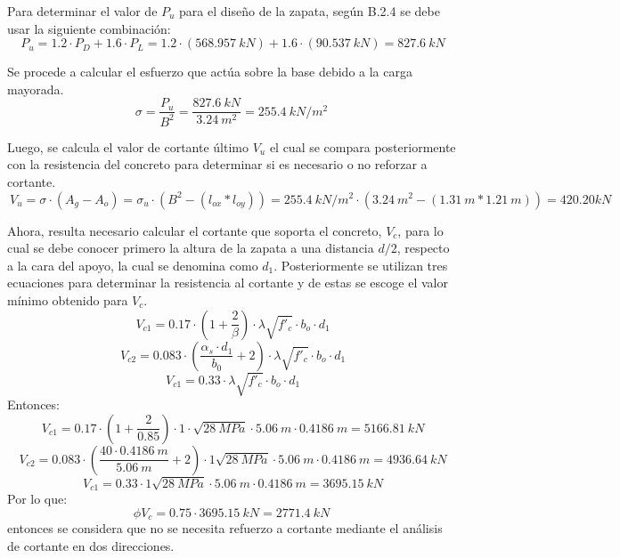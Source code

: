 \documentclass[12pt]{article}
\begin{document}
Para determinar el valor de $P_{u}$ para el diseño de la zapata, según B.2.4 se debe usar la siguiente combinación:
\begin{equation*}
    \ P_{u}= 1.2\cdot P_{D}+1.6\cdot P_{L}=1.2\cdot (568.957~kN)+1.6\cdot (90.537~kN)=827.6~kN
\end{equation*}

Se procede a calcular el esfuerzo que actúa sobre la base debido a la carga mayorada.
\begin{equation*}
    \sigma=\frac{P_{u}}{B^2} =\frac{827.6~kN}{3.24~m^2}=255.4~kN/m^2
\end{equation*}

Luego, se calcula el valor de cortante último $V_{u}$ el cual se compara posteriormente con la resistencia del concreto para determinar si es necesario o no reforzar a cortante.
\begin{equation*}
    \ V_{u}=\sigma \cdot(A_{g}-A_{o})= \sigma_{u} \cdot(B^2-(l_{ox}*l_{oy})) = 255.4~kN/m^2\cdot(3.24~m^2-(1.31~m*1.21~m))=420.20 kN
\end{equation*}

Ahora, resulta necesario calcular el cortante que soporta el concreto, $V_{c}$, para lo cual se debe conocer primero la altura de la zapata a una distancia $d/2$, respecto a la cara del apoyo, la cual se denomina como $d_{1}$. Posteriormente se utilizan tres ecuaciones para determinar la resistencia al cortante y de estas se escoge el valor mínimo obtenido para $V_{c}$.
\begin{equation*}
    \ V_{c1}=0.17\cdot \left(1+\frac{2}{\beta} \right)\cdot\lambda\sqrt{f'_{c}}\cdot b_{o} \cdot d_{1}
\end{equation*}
\begin{equation*}
    \ V_{c2}=0.083\cdot \left(\frac{\alpha_{s}\cdot d_{1}}{b_{0}}+2 \right)\cdot\lambda\sqrt{f'_{c}}\cdot b_{o} \cdot d_{1}
\end{equation*}
\begin{equation*}
    \ V_{c1}=0.33\cdot\lambda\sqrt{f'_{c}}\cdot b_{o} \cdot d_{1}
\end{equation*}
Entonces:
\begin{equation*}
    \ V_{c1}=0.17\cdot \left(1+\frac{2}{0.85} \right)\cdot 1 \cdot \sqrt{28~MPa}\cdot 5.06~m \cdot 0.4186~m=5166.81~kN
\end{equation*}
\begin{equation*}
    \ V_{c2}=0.083\cdot \left(\frac{40 \cdot 0.4186~m}{5.06~m}+2 \right)\cdot 1 \sqrt{28~MPa}\cdot 5.06~m \cdot 0.4186~m=4936.64~kN
\end{equation*}
\begin{equation*}
    \ V_{c1}=0.33\cdot1 \sqrt{28~MPa}\cdot 5.06~m \cdot 0.4186~m=3695.15~kN
\end{equation*}
Por lo que:
\begin{equation*}
    \phi V_{c}=0.75\cdot3695.15~kN=2771.4~kN
\end{equation*}
entonces se considera que no se necesita refuerzo a cortante mediante el análisis de cortante en dos direcciones.
\end{document}
